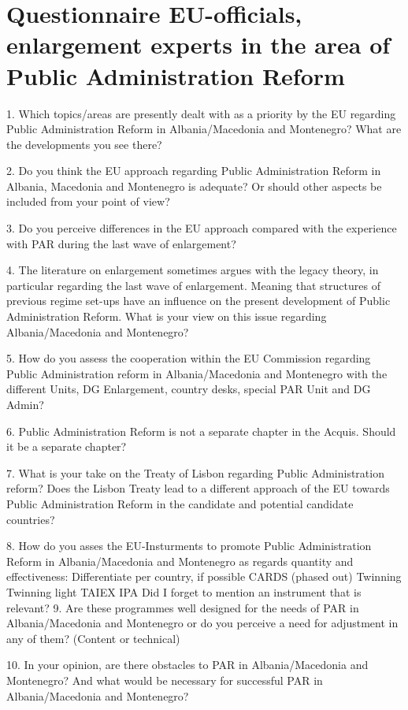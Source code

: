 \chapter[Questionnaire EU-officials, enlargement experts]{Questionnaire EU-officials, enlargement experts in the area of Public Administration Reform }
\label{anhang:Questionnaire EU-officials}
1. Which topics/areas are presently dealt with as a priority by the EU regarding Public Administration Reform in Albania/Macedonia and Montenegro? What are the developments you see there?

2. Do you think the EU approach regarding Public Administration Reform in Albania, Macedonia and Montenegro is adequate? Or should other aspects be included from your point of view?

3. Do you perceive differences in the EU approach compared with the experience with PAR during the last wave of enlargement?

4. The literature on enlargement sometimes argues with the legacy theory, in particular regarding the last wave of enlargement. Meaning that structures of previous regime set-ups have an influence on the present development of Public Administration Reform. What is your view on this issue regarding Albania/Macedonia and Montenegro?

5. How do you assess the cooperation within the EU Commission regarding Public Administration reform in Albania/Macedonia and Montenegro with the different Units, DG Enlargement, country desks, special PAR Unit and DG Admin? 

6. Public Administration Reform is not a separate chapter in the Acquis. Should it be a separate chapter? 

7. What is your take on the Treaty of Lisbon regarding Public Administration reform? Does the Lisbon Treaty lead to a different approach of the EU towards Public Administration Reform in the candidate and potential candidate countries? 

8. How do you asses the EU-Insturments to promote Public Administration Reform in Albania/Macedonia and Montenegro as regards quantity and effectiveness:
Differentiate per country, if possible
CARDS (phased out)
Twinning
Twinning light
TAIEX
IPA
Did I forget to mention an instrument that is relevant?
9. Are these programmes well designed for the needs of PAR in Albania/Macedonia and Montenegro or do you perceive a need for adjustment in any of them? (Content or technical)


10. In your opinion, are there obstacles to PAR in Albania/Macedonia and Montenegro? And what would be necessary for successful PAR in Albania/Macedonia and Montenegro? 

